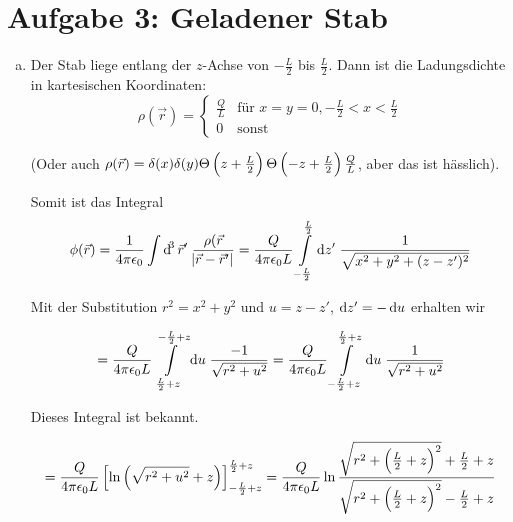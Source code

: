 \documentclass[a4paper,german,12pt,smallheadings]{scrartcl}
\begin{document}
\section*{Aufgabe 3: Geladener Stab}
\begin{enumerate}[a)]
  \item
    Der Stab liege entlang der $z$-Achse von $-\frac{L}{2}$ bis $\frac{L}{2}$.
    Dann ist die Ladungsdichte in kartesischen Koordinaten:
    \begin{equation}
      \rho(\vec{r}) = \begin{cases}
        \frac{Q}{L} &\mbox{für } x = y = 0, -\frac{L}{2} < x < \frac{L}{2} \\
        0           &\mbox{sonst}
      \end{cases}
    \end{equation}

    (Oder auch $\rho(\vec{r}) = \delta(x) \delta(y) \Theta\del{z + \frac{L}{2}}
    \Theta\del{-z + \frac{L}{2}} \frac{Q}{L}$, aber das ist hässlich).

    Somit ist das Integral
    \begin{equation}
      \phi(\vec{r}) = \frac{1}{4 \pi \epsilon_0} \int \dif^3\vec{r}' \; \frac{\rho(\vec{r}}{\envert{\vec{r} - \vec{r}'}}
      =
      \frac{Q}{4 \pi \epsilon_0 L} \int\limits_{-\frac{L}{2}}^{\frac{L}{2}} \dif z' \; \frac{1}{\sqrt{x^2 + y^2 + (z - z')^2}}
    \end{equation}

    Mit der Substitution $r^2 = x^2 + y^2$ und $u = z - z'$, $\dif z' = - \dif u$ erhalten wir

    \begin{equation}
      = \frac{Q}{4 \pi \epsilon_0 L} \int\limits_{\frac{L}{2}+z}^{-\frac{L}{2}+z} \dif u \; \frac{-1}{\sqrt{r^2 + u^2}}
      = \frac{Q}{4 \pi \epsilon_0 L} \int\limits_{-\frac{L}{2}+z}^{\frac{L}{2}+z} \dif u \; \frac{1}{\sqrt{r^2 + u^2}}
    \end{equation}

    Dieses Integral ist bekannt.

    \begin{equation}
      = \frac{Q}{4 \pi \epsilon_0 L} \sbr[2]{\ln\del{ \sqrt{r^2 + u^2} + z}}_{-\frac{L}{2} + z}^{\frac{L}{2} + z}
      = \frac{Q}{4 \pi \epsilon_0 L} \ln \frac{
        \sqrt{r^2 + \del{\frac{L}{2} + z}^2} + \frac{L}{2} + z
      }{
        \sqrt{r^2 + \del{\frac{L}{2} + z}^2} - \frac{L}{2} + z
      }
    \end{equation}


\end{enumerate}
\end{document}
